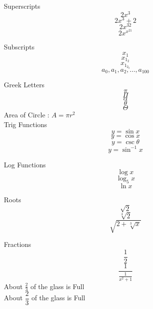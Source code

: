 \documentclass{article}
\begin{document}
Superscripts
$$  2x^3  $$
$$  2x^3+2  $$
$$  2x^{32}  $$
$$  2x^{x^{21}}  $$


Subscripts
$$  x_1  $$
$$  x_{1_2}  $$
$$  x_{1_{2_3}}  $$
$$  a_0,a_1,a_2,\ldots,a_{100}  $$


Greek Letters
$$		\pi		$$
$$		\Pi		$$
$$		\alpha		$$
$$		\theta		$$
$$		\Theta		$$
Area of Circle : $		A = \pi r^2		$ \\ [10pt]

Trig Functions
$$		y = \sin x		$$
$$		y = \cos x		$$
$$		y = \csc\theta		$$
$$		y = \sin^{-1} x		$$


Log Functions
$$		\log x		$$
$$		\log_5	x	$$
$$		\ln x		$$


Roots 
$$		\sqrt{2}		$$
$$		\sqrt[3]{2}		$$
$$		\sqrt{2+\sqrt[3]{x}}		$$


Fractions
$$		\frac{1}{2}		$$
$$		\frac{1}{\frac{1}{x^2+1}}	$$
About $\frac{2}{3}$ of the glass is Full \\[3pt]
About $\dfrac{2}{3}$ of the glass is Full
\end{document}
